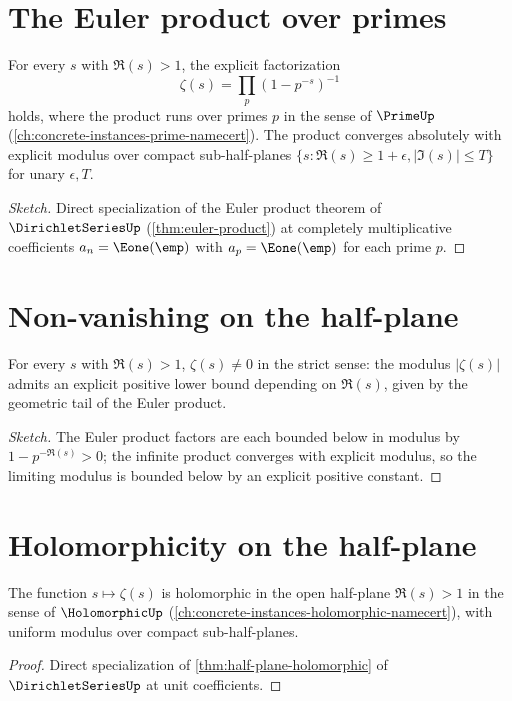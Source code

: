 \section{The Euler product over primes}

\begin{theorem}
\label{thm:zeta-euler-product}
For every \(s\) with \(\Re(s) > 1\), the explicit factorization
$$\zeta(s) = \prod_p (1 - p^{-s})^{-1}$$
holds, where the product runs over primes \(p\) in the sense of \(\PrimeUp\) (\autoref{ch:concrete-instances-prime-namecert}). The product converges absolutely with explicit modulus over compact sub-half-planes \(\{s : \Re(s) \geq 1 + \epsilon, |\Im(s)| \leq T\}\) for unary \(\epsilon, T\).
\end{theorem}
\begin{proof}[Sketch]
Direct specialization of the Euler product theorem of \(\DirichletSeriesUp\) (\autoref{thm:euler-product}) at completely multiplicative coefficients \(a_n = \Eone(\emp)\) with \(a_p = \Eone(\emp)\) for each prime \(p\).
\end{proof}

\section{Non-vanishing on the half-plane}

\begin{theorem}
\label{thm:non-vanishing-half-plane}
For every \(s\) with \(\Re(s) > 1\), \(\zeta(s) \neq 0\) in the strict sense: the modulus \(|\zeta(s)|\) admits an explicit positive lower bound depending on \(\Re(s)\), given by the geometric tail of the Euler product.
\end{theorem}
\begin{proof}[Sketch]
The Euler product factors are each bounded below in modulus by \(1 - p^{-\Re(s)} > 0\); the infinite product converges with explicit modulus, so the limiting modulus is bounded below by an explicit positive constant.
\end{proof}

\section{Holomorphicity on the half-plane}

\begin{theorem}
\label{thm:zeta-half-plane-holomorphic}
The function \(s \mapsto \zeta(s)\) is holomorphic in the open half-plane \(\Re(s) > 1\) in the sense of \(\HolomorphicUp\) (\autoref{ch:concrete-instances-holomorphic-namecert}), with uniform modulus over compact sub-half-planes.
\end{theorem}
\begin{proof}
Direct specialization of \autoref{thm:half-plane-holomorphic} of \(\DirichletSeriesUp\) at unit coefficients.
\end{proof}

